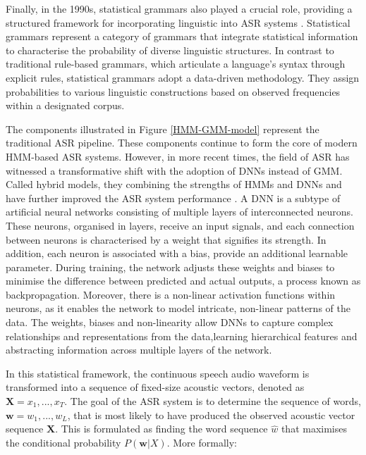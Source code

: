 Finally, in the 1990s, statistical grammars also played a crucial role, providing a structured framework for incorporating linguistic into \ac{ASR} systems \cite{darpa1992}. Statistical grammars represent a category of grammars that integrate statistical information to characterise the probability of diverse linguistic structures. In contrast to traditional rule-based grammars, which articulate a language's syntax through explicit rules, statistical grammars adopt a data-driven methodology. They assign probabilities to various linguistic constructions based on observed frequencies within a designated corpus.

The components illustrated in Figure \ref{HMM-GMM-model} represent the traditional \ac{ASR} pipeline. These components continue to form the core of modern \ac{HMM}-based \ac{ASR} systems. However, in more recent times, the field of \ac{ASR} has witnessed a transformative shift with the adoption of \acp{DNN} instead of \ac{GMM}. Called hybrid models, they combining the strengths of \acp{HMM} and \acp{DNN} and  have further improved the \ac{ASR} system performance \cite{hmm-dnn}. A \ac{DNN} is a subtype of artificial neural networks consisting of multiple layers of interconnected neurons. These neurons, organised in layers, receive an input signals, and each connection between neurons is characterised by a weight that signifies its strength. In addition, each neuron is associated with a bias, provide an additional learnable parameter. During training, the network adjusts these weights and biases to minimise the difference between predicted and actual outputs, a process known as backpropagation. Moreover, there is a non-linear activation functions within neurons, as it enables the network to model intricate, non-linear patterns of the data. The weights, biases and non-linearity allow \acp{DNN} to capture complex relationships and representations from the data,learning hierarchical features and abstracting information across multiple layers of the network.

In this statistical framework, the continuous speech audio waveform is transformed into a sequence of fixed-size acoustic vectors, denoted as $\boldsymbol{X}=x_1,...,x_T$. The goal of the \ac{ASR} system is to determine the sequence of words, $\boldsymbol{w}=w_1,...,w_L$, that is most likely to have produced the observed acoustic vector sequence $\boldsymbol{X}$. This is formulated as finding the word sequence $\hat{w}$ that maximises the conditional probability $P(\boldsymbol{w}|X)$. More formally:

